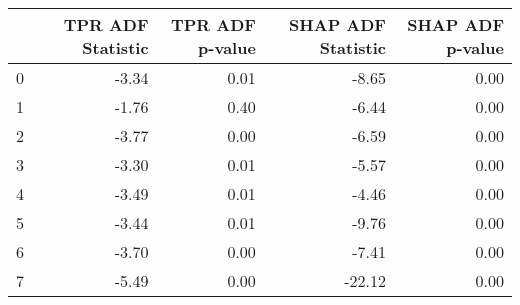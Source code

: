 \begin{tabular}{lrrrr}
\toprule
 & TPR ADF Statistic & TPR ADF p-value & SHAP ADF Statistic & SHAP ADF p-value \\
\midrule
0 & -3.34 & 0.01 & -8.65 & 0.00 \\
1 & -1.76 & 0.40 & -6.44 & 0.00 \\
2 & -3.77 & 0.00 & -6.59 & 0.00 \\
3 & -3.30 & 0.01 & -5.57 & 0.00 \\
4 & -3.49 & 0.01 & -4.46 & 0.00 \\
5 & -3.44 & 0.01 & -9.76 & 0.00 \\
6 & -3.70 & 0.00 & -7.41 & 0.00 \\
7 & -5.49 & 0.00 & -22.12 & 0.00 \\
\bottomrule
\end{tabular}
